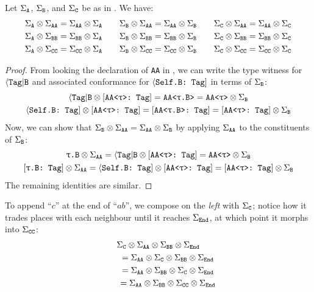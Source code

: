 \documentclass[../generics]{subfiles}
\begin{document}
\begin{lemma}\label{tag abc lemma}
Let $\Sigma_{\texttt{A}}$, $\Sigma_{\texttt{B}}$, and $\Sigma_{\texttt{C}}$ be as in . We have:
\begin{gather*}
\Sigma_{\texttt{A}}\otimes\Sigma_{\texttt{AA}}=\Sigma_{\texttt{AA}}\otimes\Sigma_{\texttt{A}} \qquad \Sigma_{\texttt{B}}\otimes\Sigma_{\texttt{AA}}=\Sigma_{\texttt{AA}}\otimes\Sigma_{\texttt{B}} \qquad \Sigma_{\texttt{C}}\otimes\Sigma_{\texttt{AA}}=\Sigma_{\texttt{AA}}\otimes\Sigma_{\texttt{C}}\\
\Sigma_{\texttt{A}}\otimes\Sigma_{\texttt{BB}}=\Sigma_{\texttt{BB}}\otimes\Sigma_{\texttt{A}} \qquad \Sigma_{\texttt{B}}\otimes\Sigma_{\texttt{BB}}=\Sigma_{\texttt{BB}}\otimes\Sigma_{\texttt{B}} \qquad \Sigma_{\texttt{C}}\otimes\Sigma_{\texttt{BB}}=\Sigma_{\texttt{BB}}\otimes\Sigma_{\texttt{C}}\\
\Sigma_{\texttt{A}}\otimes\Sigma_{\texttt{CC}}=\Sigma_{\texttt{CC}}\otimes\Sigma_{\texttt{A}} \qquad \Sigma_{\texttt{B}}\otimes\Sigma_{\texttt{CC}}=\Sigma_{\texttt{CC}}\otimes\Sigma_{\texttt{B}} \qquad \Sigma_{\texttt{C}}\otimes\Sigma_{\texttt{CC}}=\Sigma_{\texttt{CC}}\otimes\Sigma_{\texttt{C}}
\end{gather*}
\end{lemma}
\begin{proof}
From looking the declaration of \texttt{AA} in , we can write the type witness for $\langle\texttt{Tag}|\texttt{B}$ and associated conformance for $\langle\texttt{Self.B:~Tag}]$ in terms of $\Sigma_{\texttt{B}}$:
\begin{gather*}
\langle\texttt{Tag}|\texttt{B} \otimes [\texttt{AA<$\uptau$>:~Tag}] = \texttt{AA<$\uptau$.B>} = \texttt{AA<$\uptau$>} \otimes \Sigma_{\texttt{B}}\\
\langle\texttt{Self.B:~Tag}] \otimes [\texttt{AA<$\uptau$>:~Tag}] = [\texttt{AA<$\uptau$.B>:~Tag}] = [\texttt{AA<$\uptau$>:~Tag}] \otimes \Sigma_{\texttt{B}}
\end{gather*}
Now, we can show that $\Sigma_{\texttt{B}}\otimes\Sigma_{\texttt{AA}} = \Sigma_{\texttt{AA}}\otimes\Sigma_{\texttt{B}}$ by applying $\Sigma_{\texttt{AA}}$ to the constituents of $\Sigma_{\texttt{B}}$:
\begin{gather*}
\texttt{$\uptau$.B} \otimes \SigmaAA = \AssocTypeB \otimes \ConfAATag = \texttt{AA<$\uptau$>} \otimes \SigmaB\\
\ConfReq{$\uptau$.B}{Tag} \otimes \SigmaAA = \AssocConfBTag \otimes \ConfAATag = \ConfAATag \otimes \SigmaB
\end{gather*}
The remaining identities are similar.
\end{proof}

\begin{example}
To append ``$c$'' at the end of ``$ab$'', we compose on the \emph{left} with $\Sigma_{\texttt{C}}$; notice how it trades places with each neighbour until it reaches $\Sigma_{\texttt{End}}$, at which point it morphs into $\Sigma_{\texttt{CC}}$:
\begin{gather*}
\Sigma_{\texttt{C}}\otimes\Sigma_{\texttt{AA}}\otimes\Sigma_{\texttt{BB}}\otimes\Sigma_{\texttt{End}}\\
\qquad {} = \Sigma_{\texttt{AA}}\otimes\Sigma_{\texttt{C}}\otimes\Sigma_{\texttt{BB}}\otimes\Sigma_{\texttt{End}}\\
\qquad {} = \Sigma_{\texttt{AA}}\otimes\Sigma_{\texttt{BB}}\otimes\Sigma_{\texttt{C}}\otimes\Sigma_{\texttt{End}}\\
\qquad {} = \Sigma_{\texttt{AA}}\otimes\Sigma_{\texttt{BB}}\otimes\Sigma_{\texttt{CC}}\otimes\Sigma_{\texttt{End}}
\end{gather*}
\end{example}
\end{document}
